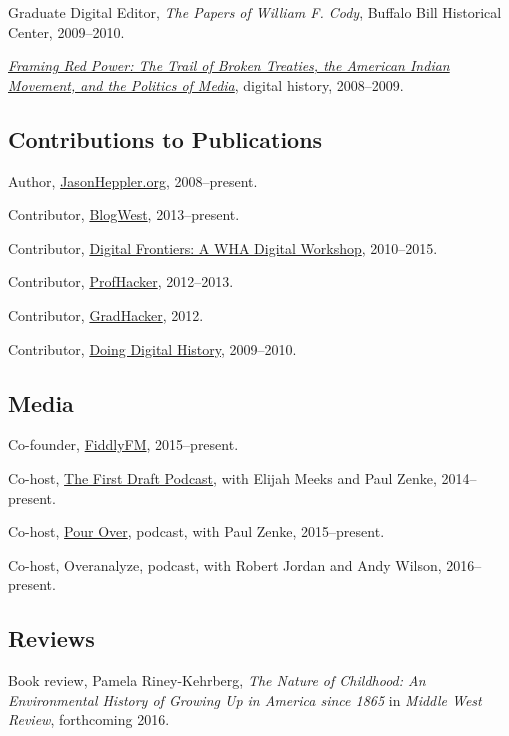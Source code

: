 Graduate Digital Editor, \emph{The Papers of William F. Cody}, Buffalo
Bill Historical Center, 2009--2010.

\emph{\href{http://framingredpower.org}{Framing Red Power: The Trail of
Broken Treaties, the American Indian Movement, and the Politics of
Media}}, digital history, 2008--2009.

\subsection{Contributions to
Publications}\label{contributions-to-publications}

Author, \href{http://jasonheppler.org}{JasonHeppler.org}, 2008--present.

Contributor, \href{http://blogwest.org/}{BlogWest}, 2013--present.

Contributor, \href{http://whadigitalfrontiers.com/}{Digital Frontiers: A
WHA Digital Workshop}, 2010--2015.

Contributor, \href{http://chronicle.com/blogs/profhacker/}{ProfHacker},
2012--2013.

Contributor,
\href{https://www.insidehighered.com/blogs/gradhacker}{GradHacker},
2012.

Contributor, \href{http://digitalhistory.unl.edu/}{Doing Digital
History}, 2009--2010.

\subsection{Media}\label{media}

Co-founder, \href{http://fiddly.fm}{FiddlyFM}, 2015--present.

Co-host, \href{http://www.fiddly.fm/firstdraft/}{The First Draft
Podcast}, with Elijah Meeks and Paul Zenke, 2014--present.

Co-host, \href{http://www.fiddly.fm/pourover/}{Pour Over}, podcast, with
Paul Zenke, 2015--present.

Co-host, Overanalyze, podcast, with Robert Jordan and Andy Wilson,
2016--present.

\subsection{Reviews}\label{reviews}

Book review, Pamela Riney-Kehrberg, \emph{The Nature of Childhood: An
Environmental History of Growing Up in America since 1865} in
\emph{Middle West Review}, forthcoming 2016.


